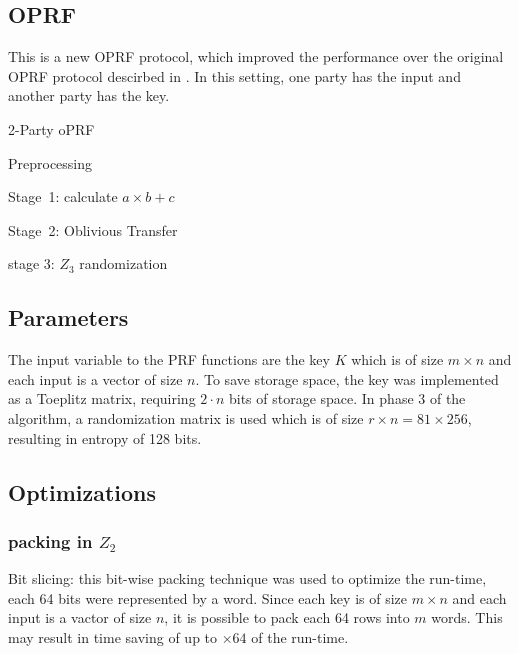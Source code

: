 \subsection{OPRF}
This is a new OPRF protocol, which improved the performance over the original OPRF protocol descirbed in \cite{darkmatter}. In this setting, one party has the input and another party has the key.

\begin{algorithm}
	\caption{2-Party oPRF}
	\begin{algorithmic}
		
		\STATE Preprocessing
		
		\STATE Stage\ 1: calculate $a \times b \plus c$
		
		\STATE Stage\ 2: Oblivious Transfer
		
		\STATE stage 3: $Z_3$ randomization  
		
	\end{algorithmic}
\end{algorithm}






\subsection{Parameters}
The input variable to the PRF functions are the key $K$ which is of size $m \times n$ and each input is a vector of size $n$. 
To save storage space, the key was implemented as a Toeplitz matrix, requiring $2 \cdot n$ bits of storage space.
In phase 3 of the algorithm, a randomization matrix is used which is of size $r \times n = 81 \times 256$, resulting in entropy of 128 bits.

\subsection{Optimizations}

\subsubsection{packing in $Z_2$}

Bit slicing: this bit-wise packing technique was used to optimize the run-time, each 64 bits were represented by a word. Since each key is of size $m \times n$ and each input is a vactor of size $n$, it is possible to pack each 64 rows into $m$ words. This may result in time saving of up to $\times 64$ of the run-time.

